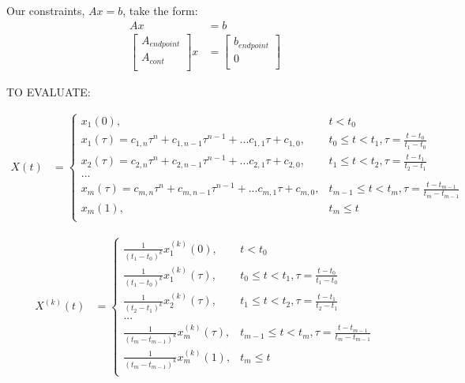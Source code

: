 \documentclass[11pt]{article}
\begin{document}
Our constraints, $Ax = b$, take the form:
\begin{align}
\nonumber Ax &= b \\
\label{eqn: Akeyframes} 
\begin{bmatrix}
A_{endpoint} \\
A_{cont} \\
 \end{bmatrix}
 x 
& = 
 \begin{bmatrix}
b_{endpoint} \\
0 \\
 \end{bmatrix} 
\end{align}



\mbox{} \newline
\mbox{} \newline
TO EVALUATE: \newline

\begin{align*}
X(t) &= 
\begin{cases}
    x_1(0), & t < t_0 \\
    x_1 (\tau) = c_{1, n} \tau^n + c_{1, n-1} \tau^{n-1} + ... c_{1, 1} \tau + c_{1, 0}, & t_0 \le t < t_1, \tau = \frac{t-t_0}{t_1-t_0}  \\
    x_2 (\tau) = c_{2, n} \tau^n + c_{2, n-1} \tau^{n-1} + ... c_{2, 1} \tau + c_{2, 0}, & t_1 \le t < t_2, \tau = \frac{t-t_1}{t_2-t_1}  \\
    ... \\
    x_m (\tau) = c_{m, n} \tau^n + c_{m, n-1} \tau^{n-1} + ... c_{m, 1} \tau + c_{m, 0}, & t_{m-1} \le t < t_m, \tau = \frac{t-t_{m-1}}{t_m-t_{m-1}} \\
    x_m(1), & t_m \le t \\
\end{cases}
\end{align*} 

\begin{align*}
X^{(k)}(t) &= 
\begin{cases}
    \frac{1}{(t_1-t_0)^k} x^{(k)}_1(0), & t < t_0 \\
    \frac{1}{(t_1-t_0)^k} x^{(k)}_1 (\tau) , & t_0 \le t < t_1, \tau = \frac{t-t_0}{t_1-t_0}  \\
    \frac{1}{(t_2-t_1)^k} x^{(k)}_2 (\tau) , & t_1 \le t < t_2, \tau = \frac{t-t_1}{t_2-t_1}  \\
    ... \\
    \frac{1}{(t_m-t_{m-1})^k} x^{(k)}_m (\tau) , & t_{m-1} \le t < t_m, \tau = \frac{t-t_{m-1}}{t_m-t_{m-1}} \\
    \frac{1}{(t_m-t_{m-1})^k} x^{(k)}_m(1), & t_m \le t \\
\end{cases}
\end{align*} 
\end{document}

